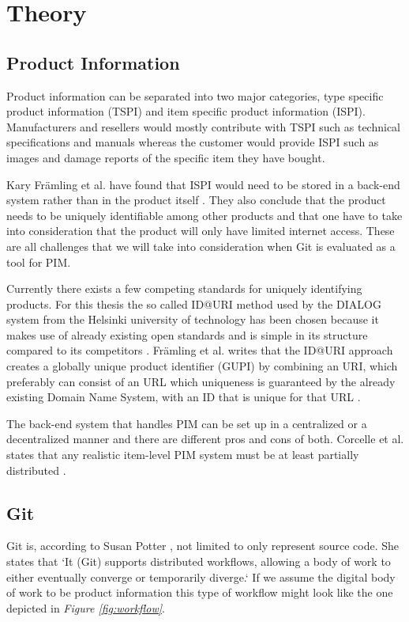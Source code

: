 \documentclass[12pt,a4paper]{article}
\begin{document}
\section{Theory}


\subsection{Product Information}
\label{productinformation}
Product information can be separated into two major categories, type specific product information (TSPI) and item specific product information (ISPI). Manufacturers and resellers would mostly contribute with TSPI such as technical specifications and manuals whereas the customer would provide ISPI such as images and damage reports of the specific item they have bought. 

Kary Främling et al. have found that ISPI would need to be stored in a back-end system rather than in the product itself \citep{gupi}. They also conclude that the product needs to be uniquely identifiable among other products and that one have to take into consideration that the product will only have limited internet access. These are all challenges that we will take into consideration when Git is evaluated as a tool for PIM. 

Currently there exists a few competing standards for uniquely identifying products. For this thesis the so called ID@URI method used by the DIALOG system from the Helsinki university of technology has been chosen because it makes use of already existing open standards and is simple in its structure compared to its competitors \citep{gupi}. Främling et al. writes that the ID@URI approach creates a globally unique product identifier (GUPI) by combining an URI, which preferably can consist of an URL which uniqueness is guaranteed by the already existing Domain Name System, with an ID that is unique for that URL \citep{agentbased}. 

The back-end system that handles PIM can be set up in a centralized or a decentralized manner and there are different pros and cons of both. Corcelle et al. states that any realistic item-level PIM system must be at least partially distributed \citep{isim}. 

\subsection{Git}
Git is, according to Susan Potter \citep{osa}, not limited to only represent source code. She states that `It (Git) supports distributed workflows, allowing a body of work to either eventually converge or temporarily diverge.` If we assume the digital body of work to be product information this type of workflow might look like the one depicted in \emph{Figure \ref{fig:workflow}}. 
\end{document}
